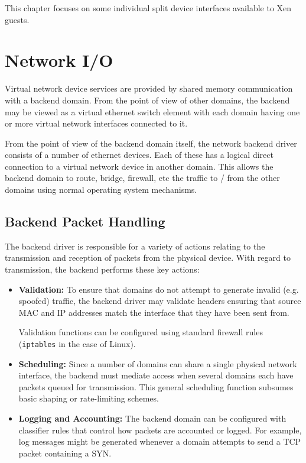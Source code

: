 \documentclass[11pt,twoside,final,openright]{report}
\begin{document}
This chapter focuses on some individual split device interfaces
available to Xen guests.

        
\section{Network I/O}

Virtual network device services are provided by shared memory
communication with a backend domain.  From the point of view of other
domains, the backend may be viewed as a virtual ethernet switch
element with each domain having one or more virtual network interfaces
connected to it.

From the point of view of the backend domain itself, the network
backend driver consists of a number of ethernet devices.  Each of
these has a logical direct connection to a virtual network device in
another domain.  This allows the backend domain to route, bridge,
firewall, etc the traffic to / from the other domains using normal
operating system mechanisms.

\subsection{Backend Packet Handling}

The backend driver is responsible for a variety of actions relating to
the transmission and reception of packets from the physical device.
With regard to transmission, the backend performs these key actions:

\begin{itemize}
\item {\bf Validation:} To ensure that domains do not attempt to
  generate invalid (e.g. spoofed) traffic, the backend driver may
  validate headers ensuring that source MAC and IP addresses match the
  interface that they have been sent from.

  Validation functions can be configured using standard firewall rules
  ({\small{\tt iptables}} in the case of Linux).
  
\item {\bf Scheduling:} Since a number of domains can share a single
  physical network interface, the backend must mediate access when
  several domains each have packets queued for transmission.  This
  general scheduling function subsumes basic shaping or rate-limiting
  schemes.
  
\item {\bf Logging and Accounting:} The backend domain can be
  configured with classifier rules that control how packets are
  accounted or logged.  For example, log messages might be generated
  whenever a domain attempts to send a TCP packet containing a SYN.
\end{itemize}
\end{document}
